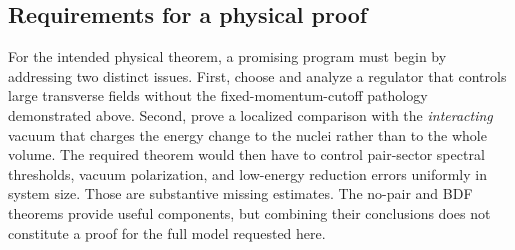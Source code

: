 \subsection{Requirements for a physical proof}
For the intended physical theorem, a promising program must begin by
addressing two distinct issues. First, choose and analyze a regulator
that controls large transverse fields without the fixed-momentum-cutoff
pathology demonstrated above. Second, prove a localized comparison with
the \emph{interacting} vacuum that charges the energy change to the nuclei
rather than to the whole volume.
The required theorem would then have to control pair-sector spectral
thresholds, vacuum polarization, and low-energy reduction errors uniformly
in system size. Those are substantive missing estimates. The no-pair
and BDF theorems provide useful components, but combining their conclusions
does not constitute a proof for the full model requested here.
